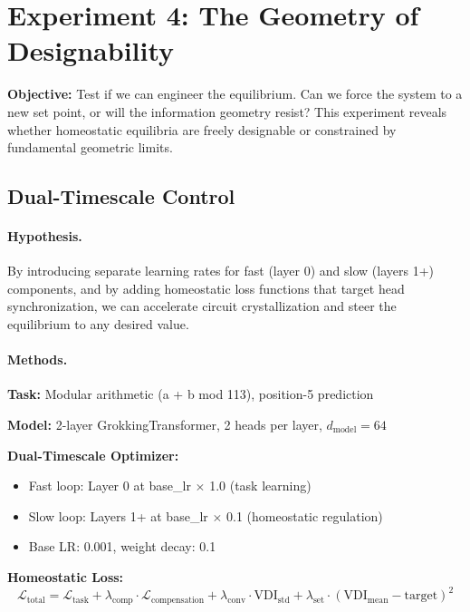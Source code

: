 \section{Experiment 4: The Geometry of Designability}\label{sec:exp4}

\textbf{Objective:} Test if we can engineer the equilibrium. Can we force the system to a new set point, or will the information geometry resist? This experiment reveals whether homeostatic equilibria are freely designable or constrained by fundamental geometric limits.

\subsection{Dual-Timescale Control}

\paragraph{Hypothesis.}
By introducing separate learning rates for fast (layer 0) and slow (layers 1+) components, and by adding homeostatic loss functions that target head synchronization, we can accelerate circuit crystallization and steer the equilibrium to any desired value.

\paragraph{Methods.}
\textbf{Task:} Modular arithmetic (a + b mod 113), position-5 prediction

\textbf{Model:} 2-layer GrokkingTransformer, 2 heads per layer, $d_{\text{model}}=64$

\textbf{Dual-Timescale Optimizer:}
\begin{itemize}
\item Fast loop: Layer 0 at base\_lr $\times$ 1.0 (task learning)
\item Slow loop: Layers 1+ at base\_lr $\times$ 0.1 (homeostatic regulation)
\item Base LR: 0.001, weight decay: 0.1
\end{itemize}

\textbf{Homeostatic Loss:}
\begin{equation}
\mathcal{L}_{\text{total}} = \mathcal{L}_{\text{task}} + \lambda_{\text{comp}} \cdot \mathcal{L}_{\text{compensation}} + \lambda_{\text{conv}} \cdot \text{VDI}_{\text{std}} + \lambda_{\text{set}} \cdot (\text{VDI}_{\text{mean}} - \text{target})^2
\end{equation}

